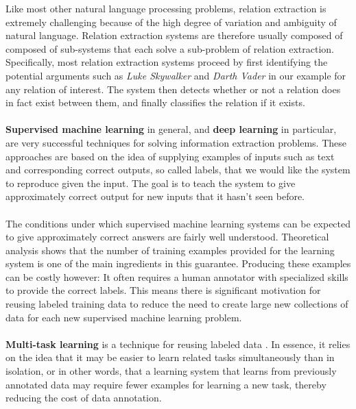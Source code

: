 Like most other natural language processing problems, relation extraction is extremely challenging because of the high degree of variation and ambiguity of natural language. Relation extraction systems are therefore usually composed of composed of sub-systems that each solve a sub-problem of relation extraction. Specifically, most relation extraction systems proceed by first identifying the potential arguments such as \textit{Luke Skywalker} and \textit{Darth Vader} in our example for any relation of interest. The system then detects whether or not a relation does in fact exist between them, and finally classifies the relation if it exists.
\\\\
\textbf{Supervised machine learning} in general, and \textbf{deep learning} in particular, are very successful techniques for solving information extraction problems. These approaches are based on the idea of supplying examples of inputs such as text and corresponding correct outputs, so called labels, that we would like the system to reproduce given the input. The goal is to teach the system to give approximately correct output for new inputs that it hasn't seen before.
\\\\
The conditions under which supervised machine learning systems can be expected to give approximately correct answers are fairly well understood. Theoretical analysis shows that the number of training examples provided for the learning system is one of the main ingredients in this guarantee. Producing these examples can be costly however: It often requires a human annotator with specialized skills to provide the correct labels. This means there is significant motivation for reusing labeled training data to reduce the need to create large new collections of data for each new supervised machine learning problem.
\\\\
\textbf{Multi-task learning} is a technique for reusing labeled data \citep{caruana1997}. In essence, it relies on the idea that it may be easier to learn related tasks simultaneously than in isolation, or in other words, that a learning system that learns from previously annotated data may require fewer examples for learning a new task, thereby reducing the cost of data annotation.